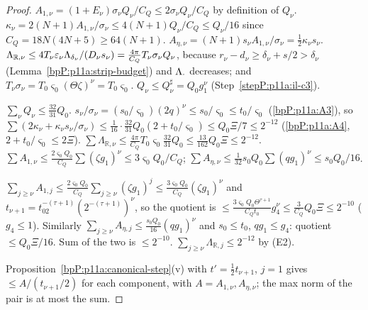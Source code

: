 \begin{proof}
\label{stepP:p11a:es-1} $A_{1,\nu}=(1+E_\nu)\sigma_\nu Q_\nu/C_Q\le2\sigma_\nu Q_\nu/C_Q$ by definition of $Q_\nu$. $\kappa_\nu=2(N+1)A_{1,\nu}/\sigma_\nu\le4(N+1)Q_\nu/C_Q\le Q_\nu/16$ since $C_Q=18N(4N+5)\ge64(N+1)$. $A_{\eta,\nu}=(N+1)s_\nu A_{1,\nu}/\sigma_\nu=\frac12\kappa_\nu s_\nu$. $\Lambda_{\mathbb R,\nu}\le4T_\nu\varepsilon_\nu\Lambda_{\delta_\nu}/(D_\nu s_\nu)=\frac{4\pi}{C_Q}T_\nu\sigma_\nu Q_\nu$, because $r_\nu-d_\nu\ge\delta_\nu+s/2>\delta_\nu$ (Lemma~\ref{bpP:p11a:strip-budget}) and $\Lambda_{\cdot}$ decreases; and $T_\nu\sigma_\nu=T_0\varsigma_0(\Theta\zeta)^\nu=T_0\varsigma_0$. $Q_\nu\le Q^\sharp_\nu=Q_0g_1^\nu$ (Step~\ref{stepP:p11a:il-c3}).

\label{stepP:p11a:es-2} $\sum_\nu Q_\nu\le\frac{32}{31}Q_0$. $s_\nu/\sigma_\nu=(s_0/\varsigma_0)(2q)^\nu\le s_0/\varsigma_0\le t_0/\varsigma_0$ (\ref{bpP:p11a:A3}), so $\sum(2\kappa_\nu+\kappa_\nu s_\nu/\sigma_\nu)\le\frac1{16}\cdot\frac{32}{31}Q_0(2+t_0/\varsigma_0)\le Q_0\Xi/7\le2^{-12}$ (\ref{bpP:p11a:A4}, $2+t_0/\varsigma_0\le2\Xi$). $\sum\Lambda_{\mathbb R,\nu}\le\frac{4\pi}{C_Q}T_0\varsigma_0\frac{32}{31}Q_0\le\frac{13}{162}Q_0\Xi\le2^{-12}$. $\sum A_{1,\nu}\le\frac{2\varsigma_0Q_0}{C_Q}\sum(\zeta g_1)^\nu\le3\varsigma_0Q_0/C_Q$; $\sum A_{\eta,\nu}\le\frac1{32}s_0Q_0\sum(qg_1)^\nu\le s_0Q_0/16$.

\label{stepP:p11a:es-3} $\sum_{j\ge\nu}A_{1,j}\le\frac{2\varsigma_0Q_0}{C_Q}\sum_{j\ge\nu}(\zeta g_1)^j\le\frac{3\varsigma_0Q_0}{C_Q}(\zeta g_1)^\nu$ and $t_{\nu+1}=t_02^{-(\tau+1)}(2^{-(\tau+1)})^\nu$, so the quotient is $\le\frac{3\varsigma_0Q_0\Theta^{\tau+1}}{C_Qt_0}g_4^\nu\le\frac{3}{C_Q}Q_0\Xi\le2^{-10}$ ($g_4\le1$). Similarly $\sum_{j\ge\nu}A_{\eta,j}\le\frac{s_0Q_0}{16}(qg_1)^\nu$ and $s_0\le t_0$, $qg_1\le g_4$: quotient $\le Q_0\Xi/16$. Sum of the two is $\le2^{-10}$. $\sum_{j\ge\nu}\Lambda_{\mathbb R,j}\le2^{-12}$ by (E2).

\label{stepP:p11a:es-4} Proposition~\ref{bpP:p11a:canonical-step}(v) with $t'=\frac12t_{\nu+1}$, $j=1$ gives $\le A/(t_{\nu+1}/2)$ for each component, with $A=A_{1,\nu},A_{\eta,\nu}$; the max norm of the pair is at most the sum.
\end{proof}

